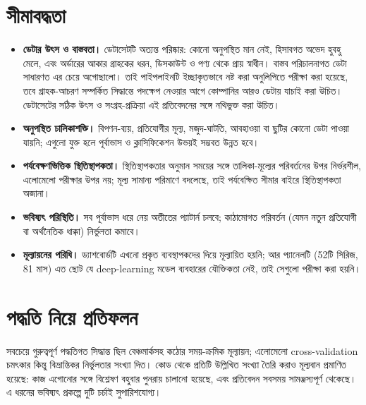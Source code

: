 \section{সীমাবদ্ধতা}\label{sec:limitations}
\begin{itemize}
  \item \textbf{ডেটার উৎস ও বাস্তবতা।} ডেটাসেটটি অত্যন্ত পরিষ্কার: কোনো অনুপস্থিত মান নেই, হিসাবগত অভেদ হুবহু মেলে, এবং অর্ডারের আকার
        গ্রাহকের ধরন, ডিসকাউন্ট ও পণ্য থেকে প্রায় স্বাধীন। বাস্তব পরিচালনাগত ডেটা সাধারণত এর চেয়ে অগোছালো। তাই পাইপলাইনটি ইচ্ছাকৃতভাবে
        নষ্ট করা অনুলিপিতে পরীক্ষা করা হয়েছে, তবে গ্রাহক-আচরণ সম্পর্কিত সিদ্ধান্তে পদক্ষেপ নেওয়ার আগে কোম্পানির আরও ডেটায় যাচাই করা উচিত।
        ডেটাসেটের সঠিক উৎস ও সংগ্রহ-প্রক্রিয়া এই প্রতিবেদনের সঙ্গে নথিভুক্ত করা উচিত।
  \item \textbf{অনুপস্থিত চালিকাশক্তি।} বিপণন-ব্যয়, প্রতিযোগীর মূল্য, মজুদ-ঘাটতি, আবহাওয়া বা ছুটির কোনো ডেটা পাওয়া যায়নি; এগুলো যুক্ত হলে
        পূর্বাভাস ও ক্লাসিফিকেশন উভয়ই সম্ভবত উন্নত হবে।
  \item \textbf{পর্যবেক্ষণভিত্তিক স্থিতিস্থাপকতা।} স্থিতিস্থাপকতার অনুমান সময়ের সঙ্গে তালিকা-মূল্যের পরিবর্তনের উপর নির্ভরশীল, এলোমেলো পরীক্ষার
        উপর নয়; মূল্য সামান্য পরিমাণে বদলেছে, তাই পর্যবেক্ষিত সীমার বাইরে স্থিতিস্থাপকতা অজানা।
  \item \textbf{ভবিষ্যৎ পরিস্থিতি।} সব পূর্বাভাস ধরে নেয় অতীতের প্যাটার্ন চলবে; কাঠামোগত পরিবর্তন (যেমন নতুন প্রতিযোগী বা অর্থনৈতিক ধাক্কা)
        নির্ভুলতা কমাবে।
  \item \textbf{মূল্যায়নের পরিধি।} ড্যাশবোর্ডটি এখনো প্রকৃত ব্যবস্থাপকদের দিয়ে মূল্যায়িত হয়নি; আর প্যানেলটি (52টি সিরিজ, 81 মাস) এত ছোট যে
        deep-learning মডেল ব্যবহারের যৌক্তিকতা নেই, তাই সেগুলো পরীক্ষা করা হয়নি।
\end{itemize}

\section{পদ্ধতি নিয়ে প্রতিফলন}
সবচেয়ে গুরুত্বপূর্ণ পদ্ধতিগত সিদ্ধান্ত ছিল বেঞ্চমার্কসহ কঠোর সময়-ক্রমিক মূল্যায়ন; এলোমেলো cross-validation চমৎকার কিন্তু বিভ্রান্তিকর
নির্ভুলতার সংখ্যা দিত। কোড থেকে প্রতিটি উল্লিখিত সংখ্যা তৈরি করাও মূল্যবান প্রমাণিত হয়েছে: কাজ এগোনোর সঙ্গে বিশ্লেষণ বহুবার পুনরায় চালানো
হয়েছে, এবং প্রতিবেদন সবসময় সামঞ্জস্যপূর্ণ থেকেছে। এ ধরনের ভবিষ্যৎ প্রকল্পে দুটি চর্চাই সুপারিশযোগ্য।
